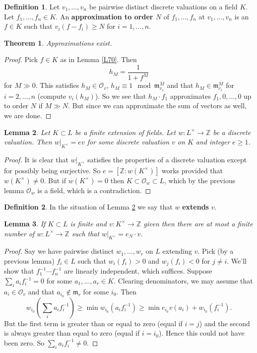 \documentclass{article}
\newcommand{\Z}{\mathbb{Z}}
\newcommand{\fr}{\mathfrak}
\theoremstyle{plain}
\newtheorem{thm}{Theorem}
\newtheorem{lem}[thm]{Lemma}
\theoremstyle{definition}
\newtheorem{defn}{Definition}
\theoremstyle{remark}
\begin{document}
\begin{defn}
Let $v_1,\ldots, v_n$ be pairwise distinct discrete valuations on a field $K$. Let $f_1,\ldots, f_n\in K$. An \textbf{approximation to order $N$} of $f_1,\ldots, f_n$
 at $v_1,\ldots, v_n$ is an $f\in K$ such that $v_i(f-f_i)\geq N$ for $i=1,\ldots,n$.
 \end{defn}

\begin{thm}
\label{L71}
Approximations exist.
\end{thm}
\begin{proof}
Pick $f\in K$ as in Lemma \ref{L70}. Then
\[h_M=\frac{1}{1+f^M}\]
for $M\gg 0$. This satisfies $h_M\in\mathcal{O}_v$, $h_M\equiv 1\mod \fr m_{v_1}^M$ and that $h_M\in \fr m_{v_i}^M$ for $i=2,\ldots, n$ (compute $v_i(h_M)$). So we see that $h_M\cdot f_1$ approximates $f_1,0,\ldots,0$ up to order $N$ if $M\gg N$. But since we can approximate the sum of vectors as well, we are done.
\end{proof}

\begin{lem}
\label{L72}
Let $K\subset L$ be a finite extension of fields. Let $w:L^\times\to\Z$ be a discrete valuation. Then $w|_{K^\times}=ev$ for some discrete valuation $v$ on $K$ and integer $e\geq 1$.
\end{lem}

\begin{proof}
It is clear that $w|_{K^\times}$ satisfies the properties of a discrete valuation except for possibly being surjective. So $e=[\Z:w(K^\times)]$ works provided that $w(K^\times)\neq 0$. But if $w(K^\times)=0$ then $K\subset\mathcal{O}_w\subset L$, which by the previous lemma $\mathcal{O}_w$ is a field, which is a contradiction.
\end{proof}

\begin{defn}
In the situation of Lemma \ref{L72} we say that $w$ \textbf{extends} $v$.
\end{defn}

\begin{lem}
\label{L73}
If $K\subset L$ is finite and $v:K^\times\to\Z$ given then there are at most a finite number of $w:L^\times\to\Z$ such that $w|_{K^\times}=e_N\cdot v$.
\end{lem}
\begin{proof}
Say we have pairwise distinct $w_1,\ldots, w_r$ on $L$ extending $v$. Pick (by a previous lemma) $f_i\in L$ such that $w_i(f_i)>0$ and $w_j(f_i)<0$ for $j\neq i$. We'll show that $f_1^{-1}\cdots f_n^{-1}$ are linearly independent, which suffices. Suppose $\sum_i a_if_i^{-1}=0$ for some $a_1,\ldots, a_r\in K$. Clearing denominators, we may assume that $a_i\in\mathcal{O}_v$ and that $a_{i_0}\notin\fr m_r$ for some $i_0$. Then
\[w_{i_0}\left(\sum_i a_if^{-1}_i\right)\geq\min w_{i_0}(a_if^{-1}_i)\geq\min e_{i_0}v(a_i)+w_{i_0}(f_i^{-1}).\]
But the first term is greater than or equal to zero (equal if $i=j$) and the second is always greater than equal to zero (equal if $i=i_0$). Hence this could not have been zero. So $\sum_i a_if_i^{-1}\neq 0$.
\end{proof}
\end{document}
